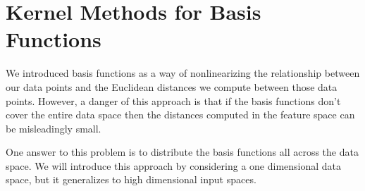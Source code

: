 \section{Kernel Methods for Basis Functions}

We introduced basis functions as a way of nonlinearizing the
relationship between our data points and the Euclidean distances we
compute between those data points. However, a danger of this approach
is that if the basis functions don't cover the entire data space then
the distances computed in the feature space can be misleadingly small.

One answer to this problem is to distribute the basis functions all
across the data space. We will introduce this approach by considering
a one dimensional data space, but it generalizes to high dimensional
input spaces.




